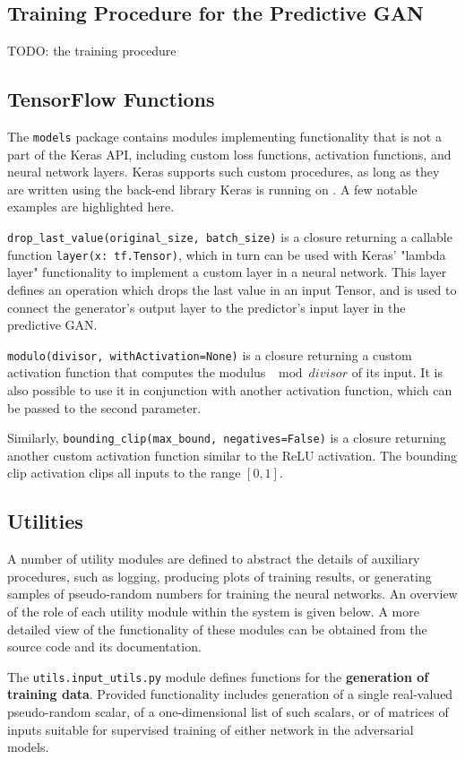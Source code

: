 \documentclass[12pt, titlepage]{report}
\theoremstyle{definition}
\begin{document}
\subsection{Training Procedure for the Predictive GAN}
TODO: the training procedure
\subsection{TensorFlow Functions}
The \texttt{models} package contains modules implementing functionality that is not a part of the Keras API, including custom loss functions, activation functions, and neural network layers. Keras supports such custom procedures, as long as they are written using the back-end library Keras is running on \cite{keras}. A few notable examples are highlighted here.

\texttt{drop_last_value(original_size, batch_size)} is a closure returning a callable function \texttt{layer(x: tf.Tensor)}, which in turn can be used with Keras' "lambda layer" functionality to implement a custom layer in a neural network. This layer defines an operation which drops the last value in an input Tensor, and is used to connect the generator's output layer to the predictor's input layer in the predictive GAN.

\texttt{modulo(divisor, withActivation=None)} is a closure returning a custom activation function that computes the modulus $\mod{divisor}$ of its input. It is also possible to use it in conjunction with another activation function, which can be passed to the second parameter.

Similarly, \texttt{bounding_clip(max_bound, negatives=False)} is a closure returning another custom activation function similar to the ReLU activation. The bounding clip activation clips all inputs to the range $[0, 1]$.
\subsection{Utilities}
A number of utility modules are defined to abstract the details of auxiliary procedures, such as logging, producing plots of training results, or generating samples of pseudo-random numbers for training the neural networks. An overview of the role of each utility module within the system is given below. A more detailed view of the functionality of these modules can be obtained from the source code and its documentation.

The \texttt{utils.input_utils.py} module defines functions for the \textbf{generation of training data}. Provided functionality includes generation of a single real-valued pseudo-random scalar, of a one-dimensional list of such scalars, or of matrices of inputs suitable for supervised training of either network in the adversarial models.
\end{document}
